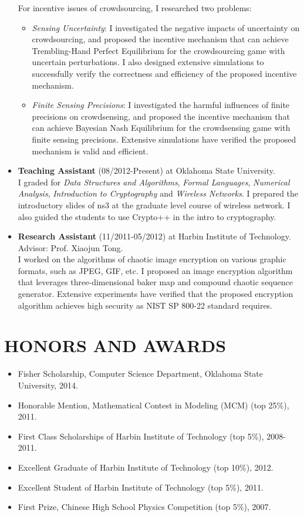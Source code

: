 \documentclass{res}
\begin{document}
\begin{resume}
\begin{itemize}
For incentive issues of crowdsourcing, I researched two problems:
\begin{itemize}
\item \emph{Sensing Uncertainty}: I investigated the negative impacts of uncertainty on crowdsourcing, and proposed the incentive mechanism that can achieve Trembling-Hand Perfect Equilibrium for the crowdsourcing game with uncertain perturbations. I also designed extensive simulations to successfully verify the correctness and efficiency of the proposed incentive mechanism.
\item \emph{Finite Sensing Precisions}: I investigated the harmful influences of finite precisions on crowdsensing, and proposed the incentive mechanism that can achieve Bayesian Nash Equilibrium for the crowdsensing game with finite sensing precisions. Extensive simulations have verified the proposed mechanism is valid and efficient.
\end{itemize}
\item \textbf{Teaching Assistant} (08/2012-Present) at Oklahoma State University.\\
I graded for \emph{Data Structures and Algorithms}, \emph{Formal Languages}, \emph{Numerical Analysis}, \emph{Introduction to Cryptography} and \emph{Wireless Networks}. I prepared the introductory slides of ns3 at the graduate level course of wireless network. I also guided the students to use Crypto++ in the intro to cryptography.
\item \textbf{Research Assistant} (11/2011-05/2012) at Harbin Institute of Technology.\\
Advisor: Prof. Xiaojun Tong.\\
I worked on the algorithms of chaotic image encryption on various graphic formats, such as JPEG, GIF, etc. I proposed an image encryption algorithm that leverages three-dimensional baker map and compound chaotic sequence generator. Extensive experiments have verified that the proposed encryption algorithm achieves high security as NIST SP 800-22 standard requires.
\end{itemize}
\end{resume}

\section{HONORS AND AWARDS}
\begin{itemize}
\item Fisher Scholarship, Computer Science Department, Oklahoma State University, 2014.
\item Honorable Mention, Mathematical Contest in Modeling (MCM) (top 25\%), 2011.
\item First Class Scholarships of Harbin Institute of Technology (top 5\%), 2008-2011.
\item Excellent Graduate of Harbin Institute of Technology (top 10\%), 2012.
\item Excellent Student of Harbin Institute of Technology (top 5\%), 2011.
\item First Prize, Chinese High School Physics Competition (top 5\%), 2007.
\end{itemize}
\end{document}
